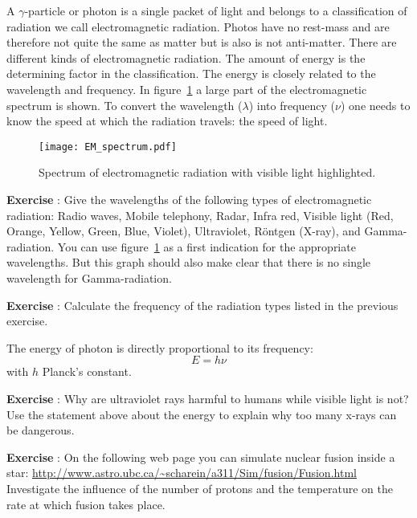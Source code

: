 A $\gamma$-particle or photon is a single packet of light and belongs to a classification of radiation we call electromagnetic radiation. Photos have no rest-mass and are therefore not quite the same as matter but is also is not anti-matter. There are different kinds of electromagnetic radiation. The amount of energy is the determining factor in the classification. The energy is closely related to the wavelength and frequency. In figure~\ref{fig:em_spec} a large part of the electromagnetic spectrum is shown. To convert the wavelength ($\lambda$) into frequency ($\nu$) one needs to know the speed at which the radiation travels: the speed of light.
\begin{figure}\begin{center}
\texttt{[image: EM\_spectrum.pdf]}%
\caption{Spectrum of electromagnetic radiation with visible light highlighted.}\label{fig:em_spec}
\end{center}\end{figure}

\begin{shaded}
\textbf{Exercise \theExercise {}} : Give the wavelengths of the following types of electromagnetic radiation: Radio waves, Mobile telephony, Radar, Infra red, Visible light (Red, Orange, Yellow, Green, Blue, Violet), Ultraviolet, R\"ontgen (X-ray), and Gamma-radiation. You can use figure~\ref{fig:em_spec} as a first indication for the appropriate wavelengths. But this graph should also make clear that there is no single wavelength for Gamma-radiation.\end{shaded}
\begin{shaded}
\textbf{Exercise \theExercise {}} : Calculate the frequency of the radiation types listed in the previous exercise.\end{shaded}
The energy of photon is directly proportional to its frequency:
\begin{equation}
E=h\nu
\end{equation}
with $h$ Planck's constant. 
\begin{shaded}
\textbf{Exercise \theExercise {}} : Why are ultraviolet rays harmful to humans while visible light is not? Use the statement above about the energy to explain why too many x-rays can be dangerous. \end{shaded}
\begin{shaded}
\textbf{Exercise \theExercise {}} : On the following web page you can simulate nuclear fusion inside a star: \url{http://www.astro.ubc.ca/~scharein/a311/Sim/fusion/Fusion.html}\\ Investigate the influence of the number of protons and the temperature on the rate at which fusion takes place. \end{shaded}

